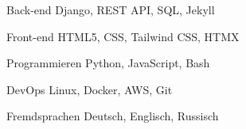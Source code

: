 
\begin{cvskills}

  \cvskill
  {Back-end} %
  {Django, REST API, SQL, Jekyll} %

  \cvskill
  {Front-end} %
  {HTML5, CSS, Tailwind CSS, HTMX} %

  \cvskill
  {Programmieren} %
  {Python, JavaScript, Bash} %

  \cvskill
  {DevOps} %
  {Linux, Docker, AWS, Git} %

  \cvskill
  {Fremdsprachen} %
  {Deutsch, Englisch, Russisch} %

\end{cvskills}

